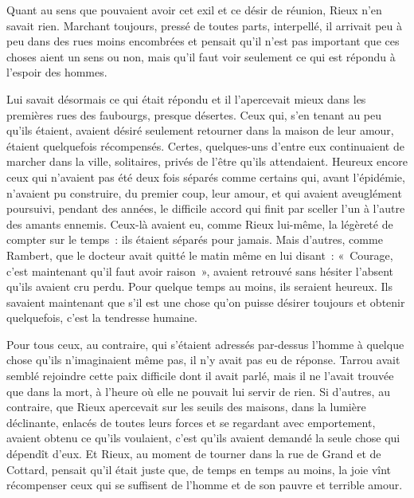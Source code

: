 \documentclass[french,twoside]{book} %
\begin{document}
Quant au sens que pouvaient avoir cet exil et ce désir de réunion, Rieux n’en savait rien. Marchant toujours, pressé de toutes parts, interpellé, il arrivait peu à peu dans des rues moins encombrées et pensait qu’il n’est pas important que ces choses aient un sens ou non, mais qu’il faut voir seulement ce qui est répondu à l’espoir des hommes.\par
Lui savait désormais ce qui était répondu et il l’apercevait mieux dans les premières rues des faubourgs, presque désertes. Ceux qui, s’en tenant au peu qu’ils étaient, avaient désiré seulement retourner dans la maison de leur amour, étaient quelquefois récompensés. Certes, quelques-uns d’entre eux continuaient de marcher dans la ville, solitaires, privés de l’être qu’ils attendaient. Heureux encore ceux qui n’avaient pas été deux fois séparés comme certains qui, avant l’épidémie, n’avaient pu construire, du premier coup, leur amour, et qui avaient aveuglément poursuivi, pendant des années, le difficile accord qui finit par sceller l’un à l’autre des amants ennemis. Ceux-là avaient eu, comme Rieux lui-même, la légèreté de compter sur le temps : ils étaient séparés pour jamais. Mais d’autres, comme Rambert, que le docteur avait quitté le matin même en lui disant : « Courage, c’est maintenant qu’il faut avoir raison », avaient retrouvé sans hésiter l’absent qu’ils avaient cru perdu. Pour quelque temps au moins, ils seraient heureux. Ils savaient maintenant que s’il est une chose qu’on puisse désirer toujours et obtenir quelquefois, c’est la tendresse humaine.\par
Pour tous ceux, au contraire, qui s’étaient adressés par-dessus l’homme à quelque chose qu’ils n’imaginaient même pas, il n’y avait pas eu de réponse. Tarrou avait semblé rejoindre cette paix difficile dont il avait parlé, mais il ne l’avait trouvée que dans la mort, à l’heure où elle ne pouvait lui servir de rien. Si d’autres, au contraire, que Rieux apercevait sur les seuils des maisons, dans la lumière déclinante, enlacés de toutes leurs forces et se regardant avec emportement, avaient obtenu ce qu’ils voulaient, c’est qu’ils avaient demandé la seule chose qui dépendît d’eux. Et Rieux, au moment de tourner dans la rue de Grand et de Cottard, pensait qu’il était juste que, de temps en temps au moins, la joie vînt récompenser ceux qui se suffisent de l’homme et de son pauvre et terrible amour.
\end{document}

